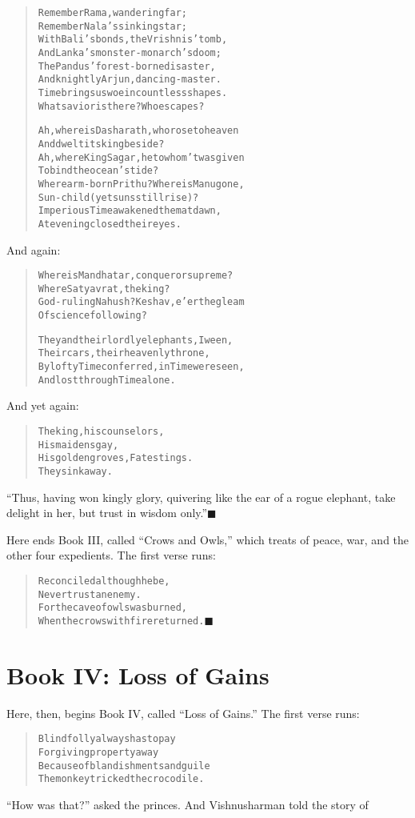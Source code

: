 \documentclass[article, twoside, 14pt]{memoir}
\newcommand{\qed}{\hfill \ensuremath{\blacksquare}}
\renewenvironment{verbatim}{%
\begin{quote}%
\vskip -10pt%
\begin{alltt}\normalfont\large}{\end{alltt}%
\end{quote}%
\vskip -10pt
} %
\begin{document}
\begin{verbatim}
Remember Rama, wandering far;
Remember Nala's sinking star;
With Bali's bonds, the Vrishnis' tomb,
And Lanka's monster-monarch's doom;
The Pandus' forest-borne disaster,
And knightly Arjun, dancing-master.
Time brings us woe in countless shapes.
What savior is there? Who escapes?

Ah, where is Dasharath, who rose to heaven
    And dwelt its king beside?
Ah, where King Sagar, he to whom 'twas given
    To bind the ocean's tide?
Where arm-born Prithu? Where is Manu gone,
    Sun-child (yet suns still rise)?
Imperious Time awakened them at dawn,
At evening closed their eyes.
\end{verbatim}
And again:

\begin{verbatim}
Where is Mandhatar, conqueror supreme?
    Where Satyavrat, the king?
God-ruling Nahush? Keshav, e'er the gleam
    Of science following?

They and their lordly elephants, I ween,
    Their cars, their heavenly throne,
By lofty Time conferred, in Time were seen,
    And lost through Time alone.
\end{verbatim}
And yet again:

\begin{verbatim}
The king, his counselors,
    His maidens gay,
His golden groves, Fate stings.
    They sink away.
\end{verbatim}
``Thus, having won kingly glory, quivering like the ear of a rogue elephant, take delight in her, but trust in wisdom only.''\hyperref[s47]{\qed}

Here ends Book III, called ``Crows and Owls,'' which treats of
peace, war, and the other four expedients. The first verse runs:

\begin{verbatim}
Reconciled although he be,
Never trust an enemy.
For the cave of owls was burned,
When the crows with fire returned.\hyperref[s46]{\qed}
\end{verbatim}
\part{Book IV: Loss of Gains}

\label{s65}

Here, then, begins Book IV, called ``Loss of Gains.'' The
first verse runs:

\begin{verbatim}
Blind folly always has to pay
For giving property away
Because of blandishments and guile{\textemdash}
The monkey tricked the crocodile.
\end{verbatim}
``How was that?'' asked the princes. And Vishnusharman told the
story of
\end{document}
